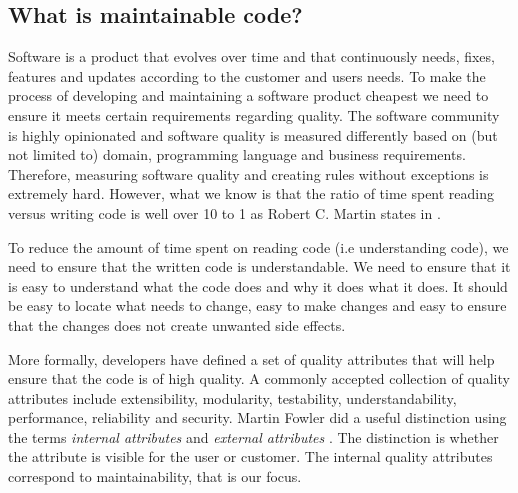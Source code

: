 \documentclass{article}
\begin{document}
\subsection{What is maintainable code?}
Software is a product that evolves over time and that continuously needs, fixes, features and updates according to the customer and users needs. To make the process of developing and maintaining a software product cheapest we need to ensure it meets certain requirements regarding quality. The software community is highly opinionated and software quality is measured differently based on (but not limited to) domain, programming language and business requirements. Therefore, measuring software quality and creating rules without exceptions is extremely hard. However, what we know is that the ratio of time spent reading versus writing code is well over 10 to 1 as Robert C. Martin states in \cite{Martin:2008:CCH:1388398}.

To reduce the amount of time spent on reading code (i.e understanding code), we need to ensure that the written code is understandable. We need to ensure that it is easy to understand what the code does and why it does what it does. It should be easy to locate what needs to change, easy to make changes and easy to ensure that the changes does not create unwanted side effects. \hfill 
\hfill \newline

More formally, developers have defined a set of quality attributes that will help ensure that the code is of high quality. A commonly accepted collection of quality attributes include extensibility, modularity, testability, understandability, performance, reliability and security. Martin Fowler did a useful distinction using the terms \textit{internal attributes} and \textit{external attributes} \cite{internalExternal}. The distinction is whether the attribute is visible for the user or customer. The internal quality attributes correspond to maintainability, that is our focus. 
\end{document}
